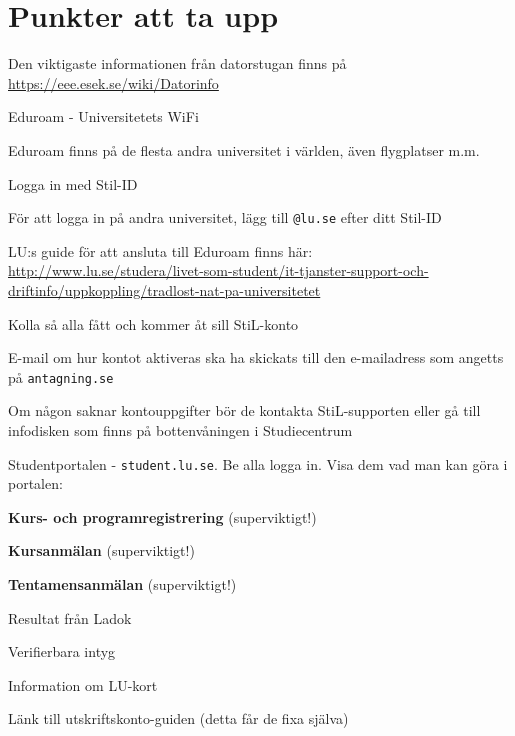 \documentclass[10pt]{article}
\begin{document}
    \section{Punkter att ta upp}
    \begin{dashlist}
        \item Den viktigaste informationen från datorstugan finns på \url{https://eee.esek.se/wiki/Datorinfo}

        \item Eduroam - Universitetets WiFi
        \begin{dashlist}
            \item Eduroam finns på de flesta andra universitet i världen, även flygplatser m.m.
            \item Logga in med Stil-ID
            \item För att logga in på andra universitet, lägg till \texttt{@lu.se} efter ditt Stil-ID
            \item LU:s guide för att ansluta till Eduroam finns här:\\
            \url{http://www.lu.se/studera/livet-som-student/it-tjanster-support-och-driftinfo/uppkoppling/tradlost-nat-pa-universitetet}
        \end{dashlist}

        \item Kolla så alla fått och kommer åt sill StiL-konto
        \begin{dashlist}
            \item E-mail om hur kontot aktiveras ska ha skickats till den e-mailadress som angetts på \texttt{antagning.se}
            \item Om någon saknar kontouppgifter bör de kontakta StiL-supporten eller gå till infodisken som finns på bottenvåningen i Studiecentrum
        \end{dashlist}

        \newpage

        \item Studentportalen - \texttt{student.lu.se}. Be alla logga in. Visa dem vad man kan göra i portalen:
        \begin{dashlist}
            \item \textbf{Kurs- och programregistrering} (superviktigt!)
            \item \textbf{Kursanmälan} (superviktigt!)
            \item \textbf{Tentamensanmälan} (superviktigt!)
            \item Resultat från Ladok
            \item Verifierbara intyg
            \item Information om LU-kort
            \item Länk till utskriftskonto-guiden (detta får de fixa själva)


\end{dashlist}
\end{dashlist}
\end{document}
